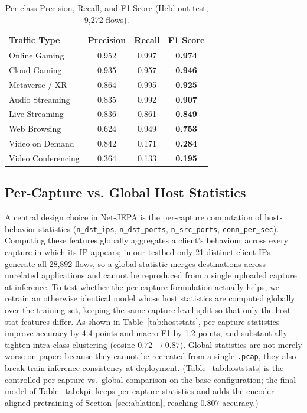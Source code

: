 \documentclass{article}
\begin{document}
\begin{table}[h]
  \caption{Per-class Precision, Recall, and F1 Score (Held-out test, 9,272 flows).}
  \label{tab:f1}
  \centering
  \begin{tabular}{lccc}
    \toprule
    Traffic Type & Precision & Recall & F1 Score \\
    \midrule
    Online Gaming & 0.952 & 0.997 & \textbf{0.974} \\
    Cloud Gaming & 0.935 & 0.957 & \textbf{0.946} \\
    Metaverse / XR & 0.864 & 0.995 & \textbf{0.925} \\
    Audio Streaming & 0.835 & 0.992 & \textbf{0.907} \\
    Live Streaming & 0.836 & 0.861 & \textbf{0.849} \\
    Web Browsing & 0.624 & 0.949 & \textbf{0.753} \\
    Video on Demand & 0.842 & 0.171 & \textbf{0.284} \\
    Video Conferencing & 0.364 & 0.133 & \textbf{0.195} \\
    \bottomrule
  \end{tabular}
\end{table}

\subsection{Per-Capture vs. Global Host Statistics}

A central design choice in Net-JEPA is the per-capture computation of host-behavior statistics (\texttt{n\_dst\_ips}, \texttt{n\_dst\_ports}, \texttt{n\_src\_ports}, \texttt{conn\_per\_sec}). Computing these features globally aggregates a client's behaviour across every capture in which its IP appears; in our testbed only 21 distinct client IPs generate all 28,892 flows, so a global statistic merges destinations across unrelated applications and cannot be reproduced from a single uploaded capture at inference. To test whether the per-capture formulation actually helps, we retrain an otherwise identical model whose host statistics are computed globally over the training set, keeping the same capture-level split so that only the host-stat features differ. As shown in Table~\ref{tab:hoststats}, per-capture statistics improve accuracy by 4.4 points and macro-F1 by 1.2 points, and substantially tighten intra-class clustering (cosine $0.72 \rightarrow 0.87$). Global statistics are not merely worse on paper: because they cannot be recreated from a single \texttt{.pcap}, they also break train-inference consistency at deployment. (Table~\ref{tab:hoststats} is the controlled per-capture vs.\ global comparison on the base configuration; the final model of Table~\ref{tab:kpi} keeps per-capture statistics and adds the encoder-aligned pretraining of Section~\ref{sec:ablation}, reaching $0.807$ accuracy.)
\end{document}
